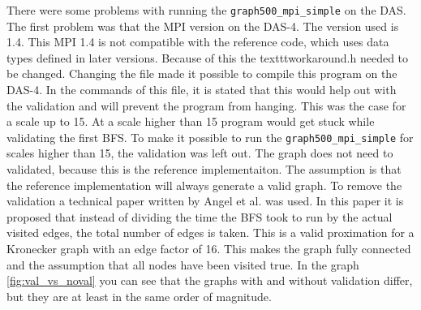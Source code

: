 There were some problems with running the \texttt{graph500\_mpi\_simple} on the DAS. The first problem was that the MPI version on the DAS-4. The version used is 1.4. This MPI 1.4 is not compatible with the reference code, which uses data types defined in later versions. Because of this the texttt{workaround.h} needed to be changed. Changing the file made it possible to compile this program on the DAS-4. In the commands of this file, it is stated that this would help out with the validation and will prevent the program from hanging. This was the case for a scale up to 15. At a scale higher than 15 program would get stuck while
validating the first BFS. To make it possible to run the  \texttt{graph500\_mpi\_simple} for scales higher than 15, the validation was left out. The graph does not need to validated, because this is the reference implementaiton. The assumption is that the reference implementation will always generate a valid graph. To remove the validation a technical paper written by Angel et al.\cite{angel2012graph} was used.
In this paper it is proposed that instead of dividing the time the BFS took to run by the actual visited edges,
the total number of edges is taken. This is a valid proximation for a Kronecker graph with an edge factor of 16. This makes the graph fully connected and the assumption that all nodes have been visited true. In the graph \ref{fig:val_vs_noval} you can see that the graphs with and without validation differ, but they are at least in the same order of magnitude. 
